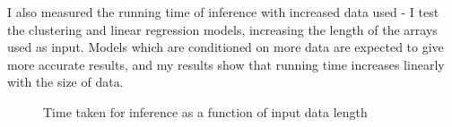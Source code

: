 I also measured the running time of inference with increased data used - I test the clustering and linear regression models, increasing the length of the arrays used as input. Models which are conditioned on more data are expected to give more accurate results, and my results show that running time increases linearly with the size of data. 

\begin{figure}[!ht]
	\centering
	
	\caption{Time taken for inference as a function of input data length}
	\label{fig:mem-perf}
\end{figure}

			
